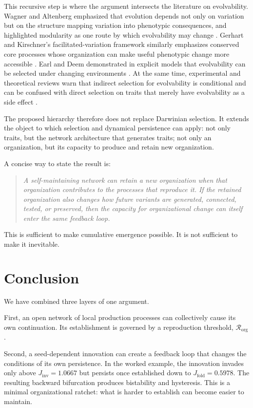 \documentclass[11pt]{article}
\newcommand{\Rorg}{\mathcal R_{\mathrm{org}}}
\begin{document}
This recursive step is where the argument intersects the literature on evolvability. Wagner and Altenberg emphasized that evolution depends not only on variation but on the structure mapping variation into phenotypic consequences, and highlighted modularity as one route by which evolvability may change \citep{wagneraltenberg1996}. Gerhart and Kirschner's facilitated-variation framework similarly emphasizes conserved core processes whose organization can make useful phenotypic change more accessible \citep{gerhart2007}. Earl and Deem demonstrated in explicit models that evolvability can be selected under changing environments \citep{earldeem2004}. At the same time, experimental and theoretical reviews warn that indirect selection for evolvability is conditional and can be confused with direct selection on traits that merely have evolvability as a side effect \citep{woods2013,wagner2022,payne2025}.

The proposed hierarchy therefore does not replace Darwinian selection. It extends the object to which selection and dynamical persistence can apply: not only traits, but the network architecture that generates traits; not only an organization, but its capacity to produce and retain new organization.

A concise way to state the result is:

\begin{quote}
\emph{A self-maintaining network can retain a new organization when that organization contributes to the processes that reproduce it. If the retained organization also changes how future variants are generated, connected, tested, or preserved, then the capacity for organizational change can itself enter the same feedback loop.}
\end{quote}

This is sufficient to make cumulative emergence possible. It is not sufficient to make it inevitable.

\section{Conclusion}

We have combined three layers of one argument.

First, an open network of local production processes can collectively cause its own continuation. Its establishment is governed by a reproduction threshold, $\Rorg$.

Second, a seed-dependent innovation can create a feedback loop that changes the conditions of its own persistence. In the worked example, the innovation invades only above $J_{\mathrm{inv}}=1.0667$ but persists once established down to $J_{\mathrm{fold}}=0.5978$. The resulting backward bifurcation produces bistability and hysteresis. This is a minimal organizational ratchet: what is harder to establish can become easier to maintain.
\end{document}
